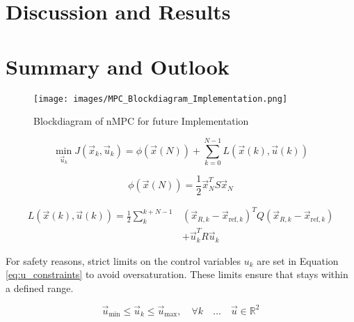 \documentclass[conference]{IEEEtran}
\begin{document}
\section{Discussion and Results}




\section{Summary and Outlook}

\begin{figure}[!h]
    \centering
    \texttt{[image: images/MPC\_Blockdiagram\_Implementation.png]}
    \caption{Blockdiagram of nMPC for future Implementation }
    \label{fig:MPC_Blockdiagram_Implementation}
\end{figure}


\newblock


\begin{equation}
\min_{\vec{u}_k} J(\vec{x}_k, \vec{u}_k) = \phi(\vec{x}(N)) + \sum_{k=0}^{N-1} L(\vec{x}(k), \vec{u}(k))
\end{equation}

\begin{equation}
\label{eq:phi_definition}
\phi(\vec{x}(N)) = \frac{1}{2} \vec{x}_N^T S \vec{x}_N
\end{equation}



\begin{equation}
\label{eq:L_function}
\begin{aligned}
L(\vec{x}(k), \vec{u}(k)) = \frac{1}{2} \sum_{k}^{k+N-1} &
(\vec{x}_{R,k} - \vec{x}_{\text{ref},k})^T Q (\vec{x}_{R,k} - \vec{x}_{\text{ref},k}) \\
&+ \vec{u}_k^T R \vec{u}_k
\end{aligned}
\end{equation}



For safety reasons, strict limits on the control variables \(u_k\) are set in Equation \ref{eq:u_constraints} to avoid oversaturation. These limits ensure that stays within a defined range.



\begin{equation}
\label{eq:u_constraints}
\vec{u}_{\text{min}} \leq \vec{u}_k \leq \vec{u}_{\text{max}}, \quad \forall k \quad \text{…} \quad \vec{u} \in \mathbb{R}^2
\end{equation}
\end{document}
